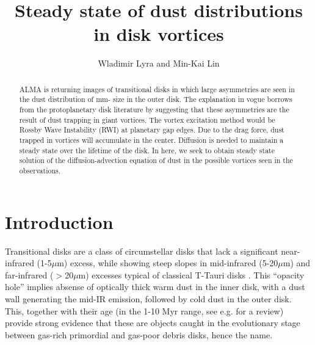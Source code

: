 \documentclass[apj]{emulateapj}
\begin{document}

\title{Steady state of dust distributions in disk vortices}
\author{Wladimir Lyra and Min-Kai Lin}

\begin{abstract}
ALMA is returning images of transitional disks in which large asymmetries are seen in the dust distribution of mm- size in the outer disk. The explanation in vogue borrows from the protoplanetary disk literature by suggesting that these asymmetries are the result of dust trapping in giant vortices. The vortex excitation method would be Rossby Wave Instability (RWI) at planetary gap edges.
Due to the drag force, dust trapped in vortices will accumulate in the center. Diffusion is needed to maintain a steady state over the lifetime of the disk. In here, we seek to obtain steady state solution of the diffusion-advection equation of dust in the possible vortices seen in the observations.
\end{abstract}

\section{Introduction}
\label{sect:introduction}



Transitional disks are a class of circumstellar disks that lack a
significant near-infrared (1-5$\mu$m) excess, while showing steep
slopes in mid-infrared (5-20$\mu$m) and
far-infrared ($>$20$\mu$m) excesses typical of classical T-Tauri disks
\citep{Strom89,Skrutskie90,Gauvin-Strom92,Wolk-Walter96,Calvet02,Calvet05,Muzerolle06,Sicilia06,Currie09,Currie-Sicilia11}. 
This ``opacity hole''  implies absense of optically thick warm dust in the inner disk, with a dust
wall generating the mid-IR emission, followed by cold dust in the
outer disk.  This, together with their age (in the 1-10 Myr range, see
e.g. \citealt{Currie10} for a review) provide strong evidence that these are
objects caught in the evolutionary stage between gas-rich 
primordial and gas-poor debris disks, hence the name. 
\end{document}
